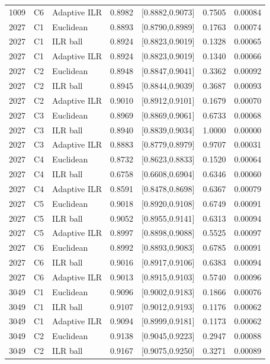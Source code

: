 \documentclass{article}
\begin{document}
{\begin{longtable}{rrlrrrr}
1009 & C6 & Adaptive ILR & 0.8982 & [0.8882,0.9073] & 0.7505 & 0.00084 \\
2027 & C1 & Euclidean & 0.8893 & [0.8790,0.8989] & 0.1763 & 0.00074 \\
2027 & C1 & ILR ball & 0.8924 & [0.8823,0.9019] & 0.1328 & 0.00065 \\
2027 & C1 & Adaptive ILR & 0.8924 & [0.8823,0.9019] & 0.1340 & 0.00066 \\
2027 & C2 & Euclidean & 0.8948 & [0.8847,0.9041] & 0.3362 & 0.00092 \\
2027 & C2 & ILR ball & 0.8945 & [0.8844,0.9039] & 0.3687 & 0.00093 \\
2027 & C2 & Adaptive ILR & 0.9010 & [0.8912,0.9101] & 0.1679 & 0.00070 \\
2027 & C3 & Euclidean & 0.8969 & [0.8869,0.9061] & 0.6733 & 0.00068 \\
2027 & C3 & ILR ball & 0.8940 & [0.8839,0.9034] & 1.0000 & 0.00000 \\
2027 & C3 & Adaptive ILR & 0.8883 & [0.8779,0.8979] & 0.9707 & 0.00031 \\
2027 & C4 & Euclidean & 0.8732 & [0.8623,0.8833] & 0.1520 & 0.00064 \\
2027 & C4 & ILR ball & 0.6758 & [0.6608,0.6904] & 0.6346 & 0.00060 \\
2027 & C4 & Adaptive ILR & 0.8591 & [0.8478,0.8698] & 0.6367 & 0.00079 \\
2027 & C5 & Euclidean & 0.9018 & [0.8920,0.9108] & 0.6749 & 0.00091 \\
2027 & C5 & ILR ball & 0.9052 & [0.8955,0.9141] & 0.6313 & 0.00094 \\
2027 & C5 & Adaptive ILR & 0.8997 & [0.8898,0.9088] & 0.5525 & 0.00097 \\
2027 & C6 & Euclidean & 0.8992 & [0.8893,0.9083] & 0.6785 & 0.00091 \\
2027 & C6 & ILR ball & 0.9016 & [0.8917,0.9106] & 0.6383 & 0.00094 \\
2027 & C6 & Adaptive ILR & 0.9013 & [0.8915,0.9103] & 0.5740 & 0.00096 \\
3049 & C1 & Euclidean & 0.9096 & [0.9002,0.9183] & 0.1866 & 0.00076 \\
3049 & C1 & ILR ball & 0.9107 & [0.9012,0.9193] & 0.1176 & 0.00062 \\
3049 & C1 & Adaptive ILR & 0.9094 & [0.8999,0.9181] & 0.1173 & 0.00062 \\
3049 & C2 & Euclidean & 0.9138 & [0.9045,0.9223] & 0.2947 & 0.00088 \\
3049 & C2 & ILR ball & 0.9167 & [0.9075,0.9250] & 0.3271 & 0.00089 \\

\end{longtable}}
\end{document}
